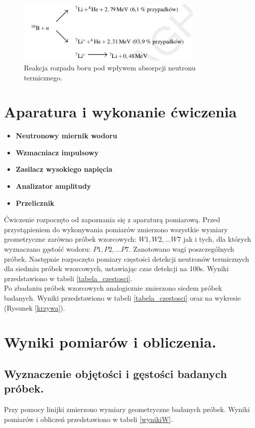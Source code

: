 \documentclass{article}
\begin{document}
\begin{figure}[h!]
	\centering
	\includegraphics[width=0.8\textwidth]{images/rozpad_boru.png}
	\caption{Reakcja rozpadu boru pod wpływem absorpcji neutronu termicznego.\cite{DzK}}
	\label{rozpad_boru}
\end{figure}




\section{Aparatura i wykonanie ćwiczenia}
\begin{itemize}
	\item \textbf{Neutronowy miernik wodoru}
	\item \textbf{Wzmacniacz impulsowy}
	\item \textbf{Zasilacz wysokiego napięcia}
	\item \textbf{Analizator amplitudy}
	\item \textbf{Przelicznik}
\end{itemize}

Ćwiczenie rozpoczęto od zapoznania się z aparaturą pomiarową. Przed przystąpieniem do wykonywania pomiarów zmierzono wszystkie wymiary geometryczne zarówno próbek wzorcowych: $W1,W2,...W7$ jak i tych, dla których wyznaczano gęstość wodoru: $P1,P2,...P7$. Zanotowano wagi poszczególnych próbek. Następnie rozpoczęto pomiary częstości detekcji neutronów termicznych dla siedmiu próbek wzorcowych, ustawiając czas detekcji na 100s. Wyniki przedstawiono w tabeli \ref{tabela_czestosci}. \\
Po zbadaniu próbek wzorcowych analogicznie zmierzono siedem próbek badanych. Wyniki przedstawiono w tabeli \ref{tabela_czestosci} oraz na wykresie (Rysunek \ref{krzywa}).

\section{Wyniki pomiarów i obliczenia.}

\subsection{Wyznaczenie objętości i gęstości badanych próbek.}
Przy pomocy linijki zmierzono wymiary geometryczne badanych próbek. Wyniki pomiarów i obliczeń przedstawiono w tabeli \ref{wynikiW}.
\end{document}
